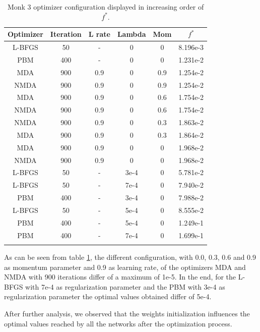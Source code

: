 \begin{longtable}{|c|c|c|c|c|c|}
	\hline
	\centering
	\textbf{Optimizer}&\textbf{Iteration} & \textbf{L rate} & \multicolumn{1}{l|}{\textbf{Lambda}} & \textbf{Mom} & \textbf{$f^{*}$} \\ \hline 
	L-BFGS & 50 & - & 0  & 0 & 8.196e-3 		\\
	PBM & 400 & - & 0  & 0 & 1.231e-2 			\\
	MDA & 900 & 0.9 & 0  & 0.9 & 1.254e-2 	\\
	NMDA & 900 & 0.9 & 0  & 0.9 & 1.254e-2 	\\
	MDA & 900 & 0.9 & 0  & 0.6 & 1.754e-2 	\\
	NMDA & 900 & 0.9 & 0  & 0.6 & 1.754e-2 	\\
	NMDA & 900 & 0.9 & 0  & 0.3 & 1.863e-2 	\\
	MDA & 900 & 0.9 & 0  & 0.3 & 1.864e-2 	\\
	MDA & 900 & 0.9 & 0  & 0 & 1.968e-2 		\\
	NMDA & 900 & 0.9 & 0  & 0 & 1.968e-2 	\\
	L-BFGS & 50 & - & 3e-4  & 0  & 5.781e-2 	\\
	L-BFGS & 50 & - & 7e-4  & 0  & 7.940e-2 	\\
	PBM & 400 & - & 3e-4  & 0 & 7.988e-2 		\\
	L-BFGS & 50 & - & 5e-4  & 0  & 8.555e-2 	\\
	PBM & 400 & - & 5e-4  & 0 & 1.249e-1 		\\
	PBM & 400 & - & 7e-4  & 0 & 1.699e-1 		\\
	\hline
		\caption{Monk 3 optimizer configuration displayed in increasing order of $f^*$.}
	\label{tab:nets_res_plots_Monk3}
\end{longtable}

As can be seen from table \ref{tab:nets_res_plots_Monk3}, the different configuration, with 0.0, 0.3, 0.6 and 0.9 as momentum parameter and 0.9 as learning rate, of the optimizers MDA and NMDA with 900 iterations differ of a maximum of 1e-5. In the end, for the L-BFGS with 7e-4 as regularization parameter and the PBM with 3e-4 as regularization parameter the optimal values obtained differ of 5e-4. 

After further analysis, we observed that the weights initialization influences the  optimal values reached by all the networks after the optimization process.

